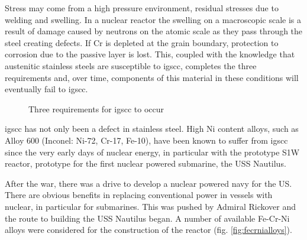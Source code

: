 Stress may come from a high pressure environment, residual stresses due to welding and swelling.  In a nuclear reactor the swelling on a macroscopic scale is a result of damage caused by neutrons on the atomic scale as they pass through the steel creating defects.  If \Gls{Cr} is depleted at the grain boundary, protection to corrosion due to the passive layer is lost.  This, coupled with the knowledge that austenitic stainless steels are susceptible to \acrshort{igscc}, completes the three requirements and, over time, components of this material in these conditions will eventually fail to \acrshort{igscc}.

\begin{figure}[h]
\begin{center}
\caption{Three requirements for \acrshort{igscc} to occur}
\label{fig:igsccrequirements}
\end{center}
\end{figure}

\acrshort{igscc} has not only been a defect in stainless steel.  High Ni content alloys, such as Alloy 600 (Inconel:  Ni-72, Cr-17, Fe-10),  have been known to suffer from \acrshort{igscc} since the very early days of nuclear energy, in particular with the prototype S1W reactor, prototype for the first nuclear powered submarine, the USS Nautilus.

After the war, there was a drive to develop a nuclear powered navy for the US.  There are obvious benefits in replacing conventional power in vessels with nuclear, in particular for submarines.  This was pushed by Admiral Rickover and the route to building the USS Nautilus began.  A number of available Fe-Cr-Ni alloys were considered for the construction of the reactor (fig. \ref{fig:fecrnialloys}).


